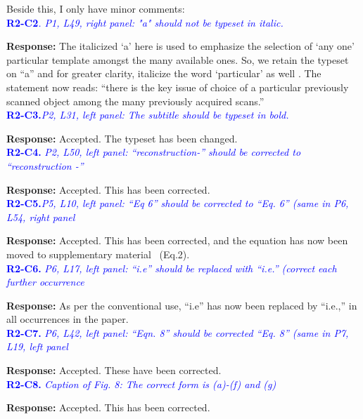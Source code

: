 \documentclass{article}
\begin{document}
Beside this, I only have minor comments:\\

\textcolor{blue}{\textbf{R2-C2}\textit{. P1, L49, right panel: "a" should not be typeset in italic.}}

\textbf{Response:} The italicized `a' here is used to emphasize the selection of `any one' particular template amongst the many available ones. So, we retain the typeset on ``a'' and for greater clarity, italicize the word `particular' as well . The statement now reads:
``there is the key issue of choice of a particular previously scanned object among the many previously acquired scans.''\\

\textcolor{blue}{\textbf{R2-C3.}\textit{P2, L31, left panel: The subtitle should be typeset in bold.}}

 \textbf{Response:} Accepted. The typeset has been changed.\\

\textcolor{blue}{\textbf{R2-C4. }\textit{P2, L50, left panel: ``reconstruction-'' should be corrected to ``reconstruction -''}}

 \textbf{Response:} Accepted. This has been corrected.\\

\textcolor{blue}{\textbf{R2-C5.}\textit{P5, L10, left panel: ``Eq 6'' should be corrected to ``Eq. 6'' (same in P6, L54, right panel}}

 \textbf{Response:} Accepted. This has been corrected, and the equation has now been moved to  supplementary material~\cite{supp_paper} (Eq.2). \\

\textcolor{blue}{\textbf{R2-C6.}\textit{ P6, L17, left panel: ``i.e'' should be replaced with ``i.e.'' (correct each further occurrence}}

 \textbf{Response:} As per the conventional use, ``i.e'' has now been replaced by ``i.e.,'' in all occurrences in the paper.\\

\textcolor{blue}{\textbf{R2-C7. }\textit{P6, L42, left panel: ``Eqn. 8'' should be corrected ``Eq. 8'' (same in P7, L19, left panel}}

  \textbf{Response:} Accepted. These have been corrected.\\
 
 \textcolor{blue}{\textbf{R2-C8.}\textit{ Caption of Fig. 8: The correct form is (a)-(f) and (g)}}

  \textbf{Response:} Accepted. This has been corrected.\\
 
\end{document}
